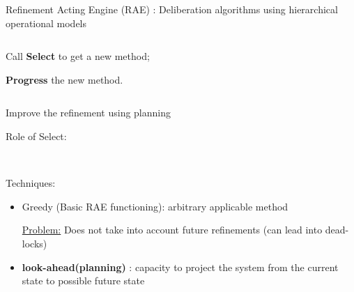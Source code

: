 \begin{frame}{Refinement Acting Engine (RAE)\cite{ghallabAutomatedPlanningActing2016} : Deliberation algorithms using hierarchical operational models}
\begin{columns}[T]
\begin{column}{0.65\textwidth}
\begin{itemize}
\begin{itemize}
                Call \textbf{Select} to get a new method;
                
                \textbf{Progress} the new method.
                \end{itemize}
                \pause
        \end{itemize}
    \end{column}
\end{columns}

    
\end{frame}

\begin{frame}{Improve the refinement using planning}
    \begin{center}
        
    Role of Select:

    ~

    

    \end{center}

    \pause
    Techniques:
    \begin{itemize}

    \item Greedy (Basic RAE functioning): arbitrary applicable method
    \pause
    
    \underline{Problem:} Does not take into account future refinements (can lead into dead-locks)
    \pause
    \item \textbf{look-ahead(planning)} : capacity to project the system from the current state to possible future state

    \end{itemize}
\end{frame}

